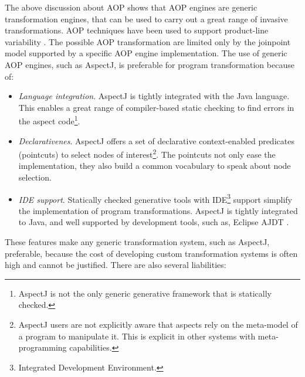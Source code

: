 The above discussion about AOP shows that AOP engines are generic transformation engines, that can be used to carry out a great range of invasive transformations. AOP techniques have been used to support product-line variability \cite{foa-aop.04,framed.aspects}. The possible AOP transformation are limited only by the joinpoint model supported by a specific AOP engine implementation. The use of generic AOP engines, such as AspectJ, is preferable for program transformation because of:

\begin{itemize}
\item \textit{Language integration}. AspectJ is tightly integrated with the Java language. This enables a great range of compiler-based static checking to find errors in the aspect code\footnote{AspectJ is not the only generic generative framework that is statically checked.}.
   
\item \textit{Declarativenes}. AspectJ offers a set of declarative context-enabled predicates (pointcuts) to select nodes of interest\footnote{AspectJ users are not explicitly aware that aspects rely on the meta-model of a program to manipulate it. This is explicit in other systems with meta-programming capabilities.}. The pointcuts not only ease the implementation, they also build a common vocabulary to speak about node selection.
\item \textit{IDE support}. Statically checked generative tools with IDE\footnote{Integrated Development Environment.} support simplify the implementation of program transformations. AspectJ is tightly integrated to Java, and well supported by development tools, such as,  Eclipse AJDT \cite{Eclipse.AJDT}.
\end{itemize}

These features make any generic transformation system, such as AspectJ, preferable, because the cost of developing custom transformation systems is often high and cannot be justified. There are also several liabilities:

